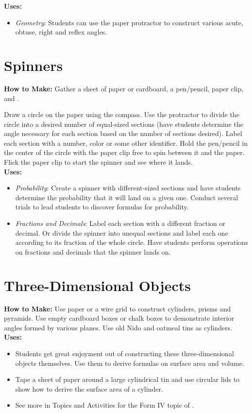 \noindent\textbf{Uses:}
\begin{itemize}
\item \emph{Geometry}: Students can use the paper protractor to construct various acute, obtuse, right and reflex angles.
\end{itemize}

\section{Spinners} \label{spinners}
\textbf{How to Make:} Gather a sheet of paper or cardboard, a pen\slash pencil, paper clip,  and .

Draw a circle on the paper using the compass. Use the protractor to divide the circle into a desired number of equal-sized sections (have students determine the angle necessary for each section based on the number of sections desired). Label each section with a number, color or some other identifier. Hold the pen\slash pencil in the center of the circle with the paper clip free to spin between it and the paper. Flick the paper clip to start the spinner and see where it lands.\\

\noindent\textbf{Uses:}
\begin{itemize}
\item \emph{Probability}: Create a spinner with different-sized sections and have students determine the probability that it will land on a given one. Conduct several trials to lead students to discover formulas for probability.
\item \emph{Fractions and Decimals}: Label each section with a different fraction or decimal. Or divide the spinner into unequal sections and label each one according to its fraction of the whole circle. Have students perform operations on fractions and decimals that the spinner lands on.
\end{itemize}


\section{Three-Dimensional Objects} \label{3dfigstools}
\textbf{How to Make:} Use paper or a wire grid to construct cylinders, prisms and pyramids. Use empty cardboard boxes or chalk boxes to demonstrate interior angles formed by various planes. Use old Nido and oatmeal tins as cylinders.\\

\noindent\textbf{Uses:}
\begin{itemize}
\item Students get great enjoyment out of constructing these three-dimensional objects themselves. Use them to derive formulas on surface area and volume.
\item Tape a sheet of paper around a large cylindrical tin and use circular lids to show how to derive the surface area of a cylinder.
\item See more in Topics and Activities for the Form IV topic of .
\end{itemize}
